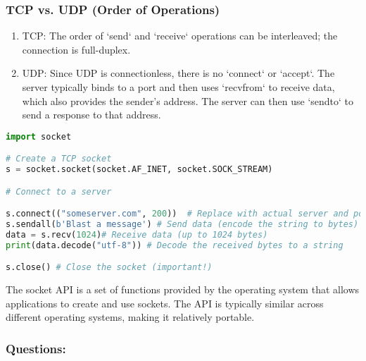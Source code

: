 \subsubsection{TCP vs. UDP (Order of Operations)}
\begin{enumerate}[itemsep=1pt]
	\item TCP: The order of `send` and `receive` operations can be interleaved; the connection is full-duplex.
	\item UDP: Since UDP is connectionless, there is no `connect` or `accept`. The server typically binds to a port and then uses `recvfrom` to receive data, which also provides the sender's address. The server can then use `sendto` to send a response to that address.
\end{enumerate}

\begin{lstlisting}[language=python,caption=Creating a socket in Python]
import socket

# Create a TCP socket
s = socket.socket(socket.AF_INET, socket.SOCK_STREAM)

# Connect to a server

s.connect(("someserver.com", 200))  # Replace with actual server and port
s.sendall(b'Blast a message') # Send data (encode the string to bytes)
data = s.recv(1024)# Receive data (up to 1024 bytes)
print(data.decode("utf-8")) # Decode the received bytes to a string

s.close() # Close the socket (important!)
\end{lstlisting}

The socket API is a set of functions provided by the operating system that allows applications to create and use sockets.  The API is typically similar across different operating systems, making it relatively portable.

\subsubsection{Questions:}

